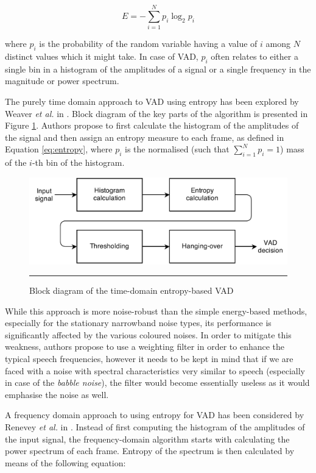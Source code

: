 \begin{equation}
E = - \sum_{i=1}^{N} p_i \log_2 p_i
\label{eq:entropy}
\end{equation}

where $p_i$ is the probability of the random variable having a value of $i$ among $N$ distinct values which it might take. In case of VAD, $p_i$ often relates to either a single bin in a histogram of the amplitudes of a signal or a single frequency in the magnitude or power spectrum.

The purely time domain approach to VAD using entropy has been explored by Weaver \emph{et al.} in \cite{Weaver}. Block diagram of the key parts of the algorithm is presented in Figure \ref{fig:Weaver}. Authors propose to first calculate the histogram of the amplitudes of the signal and then assign an entropy measure to each frame, as defined in Equation \ref{eq:entropy}, where $p_i$ is the normalised (such that $\sum_{i=1}^{N} p_i = 1$) mass of the $i$-th bin of the histogram.

\begin{figure}[htbp]
	\centering
		\includegraphics[width=0.9\columnwidth]{Figures/Weaver.png}
		\rule{37em}{0.5pt}
	\caption[Block diagram of the time-domain entropy-based VAD]{Block diagram of the time-domain entropy-based VAD \cite{Weaver}}
	\label{fig:Weaver}
\end{figure}

While this approach is more noise-robust than the simple energy-based methods, especially for the stationary narrowband noise types, its performance is significantly affected by the various coloured noises. In order to mitigate this weakness, authors propose to use a weighting filter in order to enhance the typical speech frequencies, however it needs to be kept in mind that if we are faced with a noise with spectral characteristics very similar to speech (especially in case of the \emph{babble noise}), the filter would become essentially useless as it would emphasise the noise as well.

A frequency domain approach to using entropy for VAD has been considered by Renevey \emph{et al.} in \cite{Renevey}. Instead of first computing the histogram of the amplitudes of the input signal, the frequency-domain algorithm starts with calculating the power spectrum of each frame. Entropy of the spectrum is then calculated by means of the following equation:

